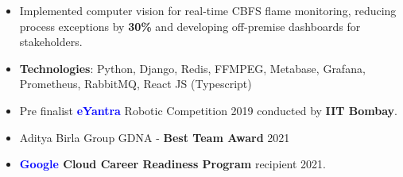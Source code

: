 \begin{itemize}
\item Implemented computer vision for real-time CBFS flame monitoring, reducing process exceptions by \textbf{ 30\% }and developing off-premise dashboards for stakeholders. 
\item \textbf{Technologies}: Python, Django, Redis, FFMPEG, Metabase, Grafana, Prometheus, Rabbit\hspace{2mm}MQ, React JS (Typescript)\\
\end{itemize}
\smallskip
\smallskip

\begin{itemize}
\item Pre finalist \textbf{\textcolor{blue}{eYantra}} Robotic Competition 2019 conducted by \textbf{IIT Bombay}.
\item Aditya Birla Group GDNA - \textbf{Best Team Award} 2021
\item \textbf{\textcolor{blue}{Google} Cloud Career Readiness Program} recipient 2021.
\end{itemize}
\smallskip
